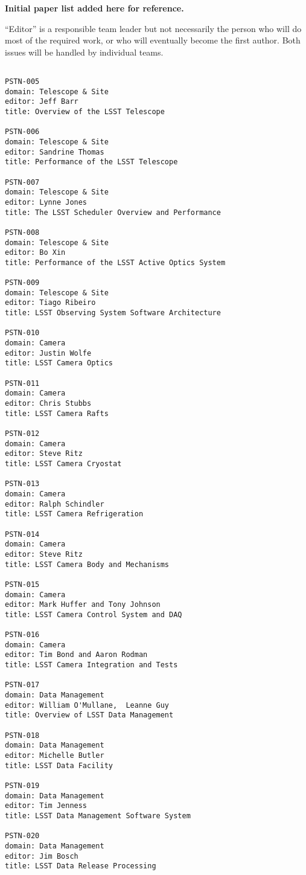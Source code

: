 \appendix{}

{\bf Initial paper list added here for reference.}

``Editor'' is a responsible team leader but not necessarily the person who will do most of
the required work, or who will eventually become the first author. Both issues will be
handled by individual teams.

\begin{verbatim}

PSTN-005
domain: Telescope & Site
editor: Jeff Barr
title: Overview of the LSST Telescope

PSTN-006
domain: Telescope & Site
editor: Sandrine Thomas
title: Performance of the LSST Telescope

PSTN-007
domain: Telescope & Site
editor: Lynne Jones
title: The LSST Scheduler Overview and Performance

PSTN-008
domain: Telescope & Site
editor: Bo Xin
title: Performance of the LSST Active Optics System

PSTN-009
domain: Telescope & Site
editor: Tiago Ribeiro
title: LSST Observing System Software Architecture

PSTN-010
domain: Camera
editor: Justin Wolfe
title: LSST Camera Optics

PSTN-011
domain: Camera
editor: Chris Stubbs
title: LSST Camera Rafts

PSTN-012
domain: Camera
editor: Steve Ritz
title: LSST Camera Cryostat

PSTN-013
domain: Camera
editor: Ralph Schindler
title: LSST Camera Refrigeration

PSTN-014
domain: Camera
editor: Steve Ritz
title: LSST Camera Body and Mechanisms

PSTN-015
domain: Camera
editor: Mark Huffer and Tony Johnson
title: LSST Camera Control System and DAQ

PSTN-016
domain: Camera
editor: Tim Bond and Aaron Rodman
title: LSST Camera Integration and Tests

PSTN-017
domain: Data Management
editor: William O'Mullane,  Leanne Guy
title: Overview of LSST Data Management

PSTN-018
domain: Data Management
editor: Michelle Butler
title: LSST Data Facility

PSTN-019
domain: Data Management
editor: Tim Jenness
title: LSST Data Management Software System

PSTN-020
domain: Data Management
editor: Jim Bosch
title: LSST Data Release Processing


\end{verbatim}
